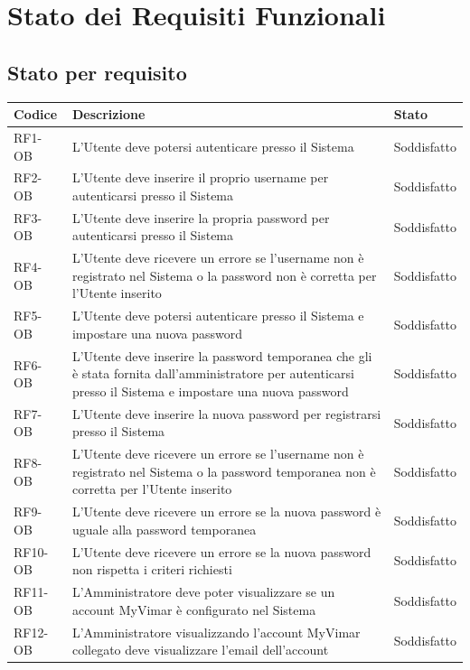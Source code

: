 \section{Stato dei Requisiti Funzionali}

\subsection{Stato per requisito}
\begin{longtable}{|p{2.5cm}|p{9cm}|p{3cm}|}
\hline
\textbf{Codice} & \textbf{Descrizione} & \textbf{Stato} \\
\hline
\endhead

RF1-OB & L'Utente deve potersi autenticare presso il Sistema & Soddisfatto \\
\hline
RF2-OB & L'Utente deve inserire il proprio username per autenticarsi presso il Sistema & Soddisfatto \\
\hline
RF3-OB & L'Utente deve inserire la propria password per autenticarsi presso il Sistema & Soddisfatto \\
\hline
RF4-OB & L'Utente deve ricevere un errore se l'username non è registrato nel Sistema o la password non è corretta per l'Utente inserito & Soddisfatto \\
\hline
RF5-OB & L'Utente deve potersi autenticare presso il Sistema e impostare una nuova password & Soddisfatto \\
\hline
RF6-OB & L'Utente deve inserire la password temporanea che gli è stata fornita dall'amministratore per autenticarsi presso il Sistema e impostare una nuova password & Soddisfatto \\
\hline
RF7-OB & L'Utente deve inserire la nuova password per registrarsi presso il Sistema & Soddisfatto \\
\hline
RF8-OB & L'Utente deve ricevere un errore se l'username non è registrato nel Sistema o la password temporanea non è corretta per l'Utente inserito & Soddisfatto \\
\hline
RF9-OB & L'Utente deve ricevere un errore se la nuova password è uguale alla password temporanea & Soddisfatto \\
\hline
RF10-OB & L'Utente deve ricevere un errore se la nuova password non rispetta i criteri richiesti & Soddisfatto \\
\hline
RF11-OB & L'Amministratore deve poter visualizzare se un account MyVimar è configurato nel Sistema & Soddisfatto \\
\hline
RF12-OB & L'Amministratore visualizzando l'account MyVimar collegato deve visualizzare l'email dell'account & Soddisfatto \\

\end{longtable}

